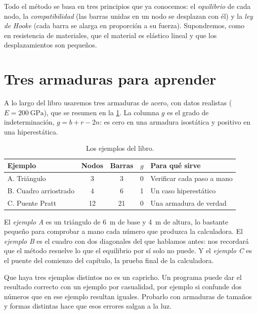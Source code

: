 \begin{recuerda}
Todo el método se basa en tres principios que ya conocemos: el
\emph{equilibrio} de cada nodo, la \emph{compatibilidad} (las barras unidas
en un nodo se desplazan con él) y la \emph{ley de Hooke} (cada barra se
alarga en proporción a su fuerza). Supondremos, como en resistencia de
materiales, que el material es elástico lineal y que los desplazamientos son
pequeños.
\end{recuerda}

\section{Tres armaduras para aprender}\label{sec:tres_ejemplos}

A lo largo del libro usaremos tres armaduras de acero, con datos realistas
($E = \SI{200}{\giga\pascal}$), que se resumen en la
\cref{tab:tres_ejemplos}. La columna $g$ es el grado de indeterminación,
$g = b + r - 2n$: es cero en una armadura isostática y positivo en una
hiperestática.

\begin{table}[ht]
  \centering
  \caption{Los ejemplos del libro.}
  \label{tab:tres_ejemplos}
  \small
  \begin{tabular}{@{}lcccl@{}}
    \toprule
    Ejemplo & Nodos & Barras & $g$ & Para qué sirve \\
    \midrule
    A. Triángulo & 3 & 3 & 0 & Verificar cada paso a mano \\
    B. Cuadro arriostrado & 4 & 6 & 1 & Un caso hiperestático \\
    C. Puente Pratt & 12 & 21 & 0 & Una armadura de verdad \\
    \bottomrule
  \end{tabular}
\end{table}

El \emph{ejemplo A} es un triángulo de \SI{6}{\metre} de base y
\SI{4}{\metre} de altura, lo bastante pequeño para comprobar a mano cada
número que produzca la calculadora. El \emph{ejemplo B} es el cuadro con dos
diagonales del que hablamos antes: nos recordará que el método resuelve lo
que el equilibrio por sí solo no puede. Y el \emph{ejemplo C} es el puente
del comienzo del capítulo, la prueba final de la calculadora.

Que haya tres ejemplos distintos no es un capricho. Un programa puede dar el
resultado correcto con un ejemplo por casualidad, por ejemplo si confunde dos
números que en ese ejemplo resultan iguales. Probarlo con armaduras de
tamaños y formas distintas hace que esos errores salgan a la luz.

